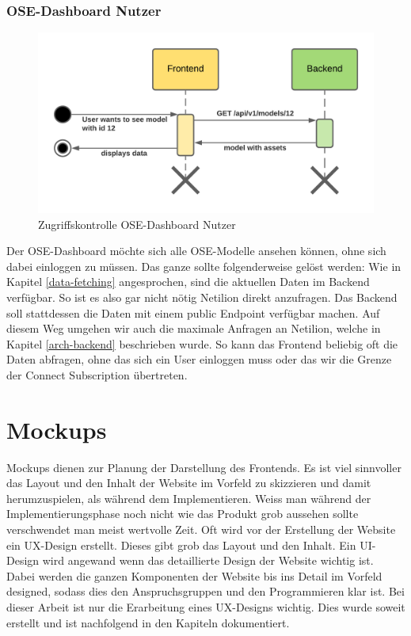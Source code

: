 \subsubsection{OSE-Dashboard Nutzer}
\begin{figure}[H]
  \centering
  \includegraphics[width=.6\linewidth]{./images/zugriffskontrolle2.png}
  \caption[{Sequenzdiagram, welches die Zugriffskontrolle für den OSE-Dashboard Nutzer beschreibt}]{Zugriffskontrolle OSE-Dashboard Nutzer}
  \label{fig:zugriffskontrolle2}
\end{figure}
Der OSE-Dashboard möchte sich alle OSE-Modelle ansehen können, ohne sich dabei einloggen zu müssen.
Das ganze sollte folgenderweise gelöst werden:
\newline
Wie in Kapitel \ref{data-fetching} angesprochen, sind die aktuellen Daten im Backend verfügbar. So ist es also gar nicht nötig Netilion direkt anzufragen. Das Backend soll stattdessen die Daten mit einem public Endpoint verfügbar machen. Auf diesem Weg umgehen wir auch die maximale Anfragen an Netilion, welche in Kapitel \ref{arch-backend} beschrieben wurde.
\newline
So kann das Frontend beliebig oft die Daten abfragen, ohne das sich ein User einloggen muss oder das wir die Grenze der Connect Subscription übertreten.
\section{Mockups}
Mockups dienen zur Planung der Darstellung des Frontends. Es ist viel sinnvoller das Layout und den Inhalt der Website im Vorfeld zu skizzieren und damit herumzuspielen, als während dem Implementieren. Weiss man während der Implementierungsphase noch nicht wie das Produkt grob aussehen sollte verschwendet man meist wertvolle Zeit.
\newline
Oft wird vor der Erstellung der Website ein UX-Design erstellt. Dieses gibt grob das Layout und den Inhalt. Ein UI-Design wird angewand wenn das detaillierte Design der Website wichtig ist. Dabei werden die ganzen Komponenten der Website bis ins Detail im Vorfeld designed, sodass dies den Anspruchsgruppen und den Programmieren klar ist.
\newline
Bei dieser Arbeit ist nur die Erarbeitung eines UX-Designs wichtig. Dies wurde soweit erstellt und ist nachfolgend in den Kapiteln dokumentiert.
\pagebreak
